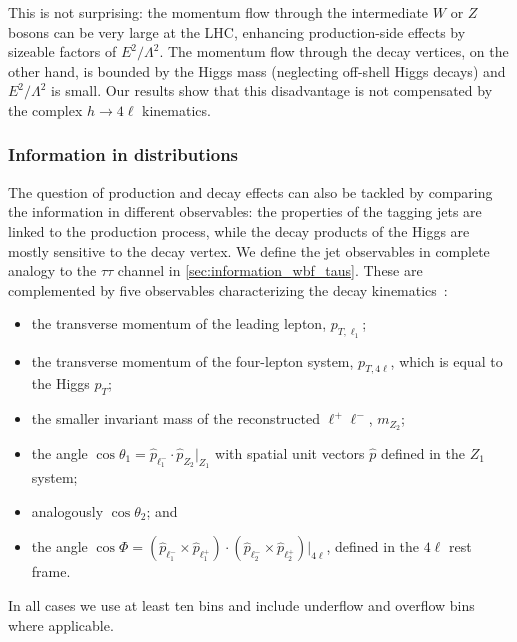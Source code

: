 This is not surprising: the momentum flow through the intermediate $W$
or $Z$ bosons can be very large at the LHC, enhancing production-side
effects by sizeable factors of $E^2 / \Lambda^2$. The momentum flow
through the decay vertices, on the other hand, is bounded by the Higgs
mass (neglecting off-shell Higgs decays) and $E^2 / \Lambda^2$ is
small. Our results show that this disadvantage is not compensated by
the complex $h \to 4\ell$ kinematics.



\subsubsection*{Information in distributions}

The question of production and decay effects can also be tackled by
comparing the information in different observables: the properties of
the tagging jets are linked to the production process, while the decay
products of the Higgs are mostly sensitive to the decay vertex. We
define the jet observables in complete analogy to the $\tau \tau$
channel in \autoref{sec:information_wbf_taus}. These are complemented
by five observables characterizing the decay
kinematics~\cite{Bolognesi:2012mm, Englert:2012xt}:
%
\begin{itemize}
\item the transverse momentum of the leading lepton, $p_{T,\ell_1}$;
\item the transverse momentum of the four-lepton system, $p_{T,4\ell}$, which is equal to the Higgs $p_T$;
\item the smaller invariant mass of the reconstructed $\ell^+ \ell^-$, $m_{Z_2}$;
\item the angle $\cos \theta_1 = \hat{p}_{\ell^-_1} \cdot \hat{p}_{Z_2}
  \Big|_{Z_1}$ with spatial unit vectors $\hat{p}$ defined in the $Z_1$ system;
\item analogously $\cos \theta_2$; and
\item the angle
  $\cos \Phi = ( \hat{p}_{\ell^-_1} \times \hat{p}_{\ell^+_1} )
  \cdot ( \hat{p}_{\ell^-_2} \times \hat{p}_{\ell^+_2} ) \Big|_{4\ell}$,
  defined in the $4\ell$ rest frame.
\end{itemize}
%
In all cases we use at least ten bins and include underflow and
overflow bins where applicable.

